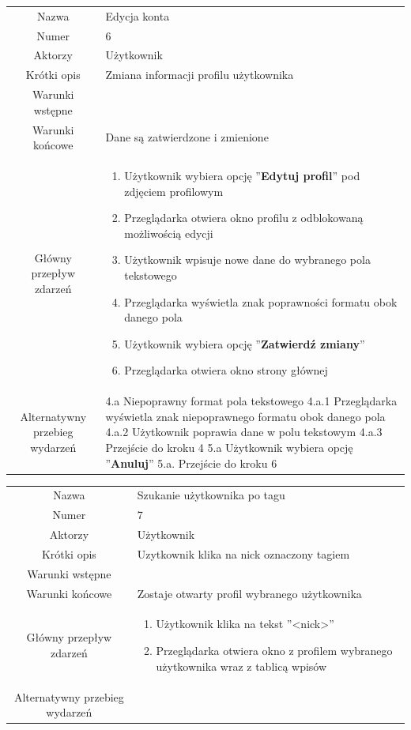 \documentclass[a4paper]{article}
\begin{document}
\newline
\newline
\begin{tabular}{c p{10cm}}
Nazwa&	Edycja konta\\
Numer	& 6\\
Aktorzy &	Użytkownik\\
Krótki opis &  Zmiana informacji profilu użytkownika\\
Warunki wstępne& \\
Warunki końcowe& Dane są zatwierdzone i zmienione\\
Główny przepływ zdarzeń&
\begin{enumerate}
\item Użytkownik wybiera opcję ''\textbf{Edytuj profil}'' pod zdjęciem profilowym
\item Przeglądarka otwiera okno profilu z odblokowaną możliwością edycji
\item Użytkownik wpisuje nowe dane do wybranego pola tekstowego
\item Przeglądarka wyświetla znak poprawności formatu obok danego pola
\item Użytkownik wybiera opcję ''\textbf{Zatwierdź zmiany}'' 
\item Przeglądarka otwiera okno strony głównej
\end{enumerate} \\

Alternatywny przebieg wydarzeń & 
4.a Niepoprawny format pola tekstowego \newline
4.a.1 Przeglądarka wyświetla znak niepoprawnego formatu obok danego pola \newline
4.a.2 Użytkownik poprawia dane w polu tekstowym\newline
4.a.3 Przejście do kroku 4\newline 
5.a Użytkownik wybiera opcję ''\textbf{Anuluj}'' \newline
5.a. Przejście do kroku 6 \newline \\
\hline
\end{tabular}
\newline
\newline
\begin{tabular}{c p{10cm}}
Nazwa&	Szukanie użytkownika po tagu\\
Numer	& 7\\
Aktorzy &	Użytkownik\\
Krótki opis &  Uzytkownik klika na nick oznaczony tagiem\\
Warunki wstępne& \\
Warunki końcowe& Zostaje otwarty profil wybranego użytkownika\\
Główny przepływ zdarzeń&
\begin{enumerate}
\item Użytkownik klika na tekst \@''<nick>''
\item Przeglądarka otwiera okno z profilem wybranego użytkownika wraz z tablicą wpisów
\end{enumerate} \\

Alternatywny przebieg wydarzeń &  \\
\hline
\end{tabular}
\end{document}
